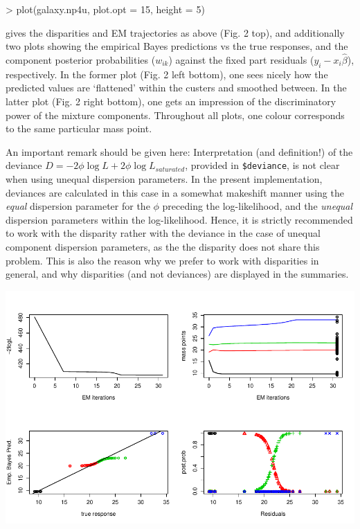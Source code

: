 \documentclass[a4paper]{article}
\begin{document}
\begin{landscape}
\begin{Schunk}
\begin{Sinput}
> plot(galaxy.np4u, plot.opt = 15, height = 5)
\end{Sinput}
\end{Schunk}

\noindent gives the disparities and EM trajectories as above (Fig. 2 top), and additionally two plots showing the empirical Bayes predictions
vs the true responses, and the component posterior probabilities ($w_{ik}$) against the fixed part residuals ($y_i-x_i\hat{\beta}$), respectively. In the former plot (Fig. 2 left bottom), one sees nicely how  the
predicted values are `flattened' within the custers and smoothed between. In the latter plot (Fig. 2 right bottom), one gets an impression 
of the discriminatory power of the mixture components. Throughout all plots, one colour corresponds to the same particular mass point.

An important remark should be given here: Interpretation (and definition!) of the deviance $D=-2\phi\log L + 2\phi\log L_{saturated}$, provided in {\tt \$deviance}, is not clear when using unequal 
dispersion parameters. In the present implementation, deviances are calculated in this case in a somewhat makeshift manner using the {\it equal} dispersion parameter for the $\phi$ preceding the log-likelihood, and the {\it unequal} dispersion parameters within the log-likelihood.
Hence, it is strictly recommended to work with the disparity rather with the deviance in the case of unequal component dispersion parameters, as the the disparity does not share this problem. This is also
the reason why we prefer to work with disparities in general, and why disparities (and not deviances) are displayed in the summaries.  

\begin{minipage}{21cm}
\includegraphics{npmlreg-v-012}


\end{minipage}
\end{landscape}
\end{document}
